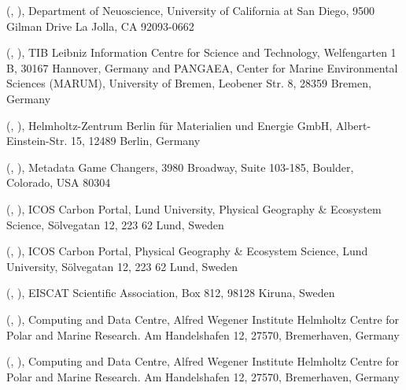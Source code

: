 \documentclass[a4paper,10pt,english]{sphinxmanual}
\begin{document}
 (, ),
Department of Neuoscience, University of California at San Diego,
9500 Gilman Drive La Jolla, CA 92093-0662

 (, ),
TIB Leibniz Information Centre for Science and Technology, Welfengarten
1 B, 30167 Hannover, Germany and PANGAEA, Center for Marine
Environmental Sciences (MARUM), University of Bremen, Leobener Str. 8,
28359 Bremen, Germany

 (, ),
Helmholtz-Zentrum Berlin für Materialien und Energie GmbH,
Albert-Einstein-Str. 15, 12489 Berlin, Germany

 (, ),
Metadata Game Changers, 3980 Broadway, Suite 103-185, Boulder,
Colorado, USA 80304

 (, ),
ICOS Carbon Portal, Lund University, Physical Geography \& Ecosystem
Science, Sölvegatan 12, 223 62 Lund, Sweden

 (, ),
ICOS Carbon Portal, Physical Geography \& Ecosystem Science, Lund
University, Sölvegatan 12, 223 62 Lund, Sweden

 (, ),
EISCAT Scientific Association, Box 812, 98128 Kiruna, Sweden

 (, ),
Computing and Data Centre, Alfred Wegener Institute Helmholtz Centre for
Polar and Marine Research. Am Handelshafen 12, 27570, Bremerhaven,
Germany

 (, ),
Computing and Data Centre, Alfred Wegener Institute Helmholtz Centre for
Polar and Marine Research. Am Handelshafen 12, 27570, Bremerhaven,
Germany
\end{document}
